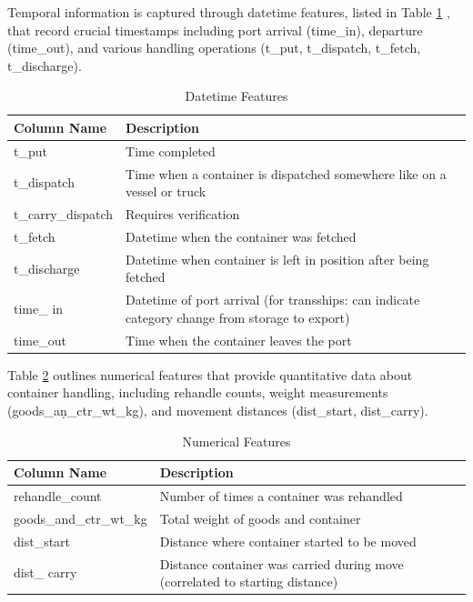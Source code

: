 		Temporal information is captured through datetime features, listed in Table \ref{tab:datetime_features}
		, that record crucial timestamps including port arrival (time\_in), departure (time\_out), and various
		handling operations (t\_put, t\_dispatch, t\_fetch, t\_discharge).
		\begin{table}[H]
			\centering
			\begin{tabular}{p{}p{}}
				\hline
				\textbf{Column Name} & \textbf{Description}
				\\
				\hline
				t\_put & Time completed
				\\
				\hline
				t\_dispatch & Time when a container is dispatched somewhere like on a vessel or truck
				\\
				\hline
				t\_carry\_dispatch & Requires verification
				\\
				\hline
				t\_fetch & Datetime when the container was fetched
				\\
				\hline
				t\_discharge & Datetime when container is left in position after being fetched
				\\
				\hline
				time\_
				in & Datetime of port arrival (for transships: can indicate category change from
				storage
				to export) \\
				\hline
				time\_out & Time when the container leaves the port
				\\
				\hline
			\end{tabular}
			\caption{Datetime Features}
			\label{tab:datetime_features}
		\end{table}

		Table \ref{tab:numerical_features}
		outlines numerical features that provide quantitative data about container handling, including rehandle
		counts, weight measurements (goods\_an\d_ctr\_wt\_kg), and movement distances (dist\_start, dist\_carry).
		\begin{table}[H]
			\centering
			\begin{tabular}{p{}p{}}
				\hline
				\textbf{Column Name} & \textbf{Description}
				\\
				\hline
				rehandle\_count & Number of times a container was rehandled
				\\
				\hline
				goods\_and\_ctr\_wt\_kg & Total weight of goods and container
				\\
				\hline
				dist\_start & Distance where container started to be moved
				\\
				\hline
				dist\_
				carry & Distance container was carried during move (correlated to starting distance) \\
				\hline
			\end{tabular}
			\caption{Numerical Features}
			\label{tab:numerical_features}
		\end{table}

